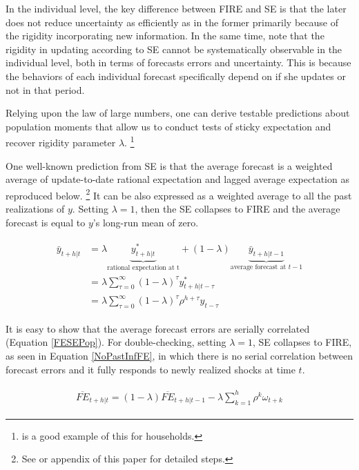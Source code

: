 \documentclass[12pt]{article}
\begin{document}
	In the individual level, the key difference between FIRE and SE is that the later does not reduce uncertainty as efficiently as in the former primarily because of the rigidity incorporating new information. In the same time, note that the rigidity in updating according to SE cannot be systematically observable in the individual level, both in terms of forecasts errors and uncertainty. This is because the behaviors of each individual forecast specifically depend on if she updates or not in that period. 
	
	Relying upon the law of large numbers, one can derive testable predictions about population moments that allow us to conduct tests of sticky expectation and recover rigidity parameter $\lambda$. \footnote{\citet{carroll2003macroeconomic} is a good example of this for households.} 
	
	One well-known prediction from SE is that the average forecast is a weighted average of update-to-date rational expectation and lagged average expectation as reproduced below. \footnote{See \citet{coibion2012can} or appendix of this paper for detailed steps.} It can be also expressed as a weighted average to all the past realizations of $y$. Setting $\lambda=1$, then the SE collapses to FIRE and the average forecast is equal to $y$'s long-run mean of zero.
	
	\begin{eqnarray}\label{MeanSEPop}
		\begin{aligned}
			\bar y_{t+h|t} & = \lambda \underbrace{y^*_{t+h|t}}_{\textrm{rational expectation at t}} + (1-\lambda) \underbrace{\bar y_{t+h|t-1}}_{\textrm{average forecast at } t-1} \\
			& = \lambda \sum^{\infty}_{\tau=0} (1-\lambda)^\tau y^*_{t+h|t-\tau} \\
			& = \lambda \sum^{\infty}_{\tau=0} (1-\lambda)^\tau \rho^{h+\tau}y_{t-\tau}
		\end{aligned}
	\end{eqnarray}
	
	It is easy to show that the average forecast errors are serially correlated (Equation \ref{FESEPop}). For double-checking, setting $\lambda=1$, SE collapses to FIRE, as seen in Equation \ref{NoPastInfFE}, in which there is no serial correlation between forecast errors and it fully responds to newly realized shocks at time $t$.  

	\begin{eqnarray}\label{FESEPop}
		\begin{aligned}
			\overline{FE}_{t+h|t}  = (1-\lambda) \overline {FE}_{t+h|t-1} - \lambda \sum^{h}_{k=1}\rho^k \omega_{t+k} 
		\end{aligned}
	\end{eqnarray}
\end{document}

